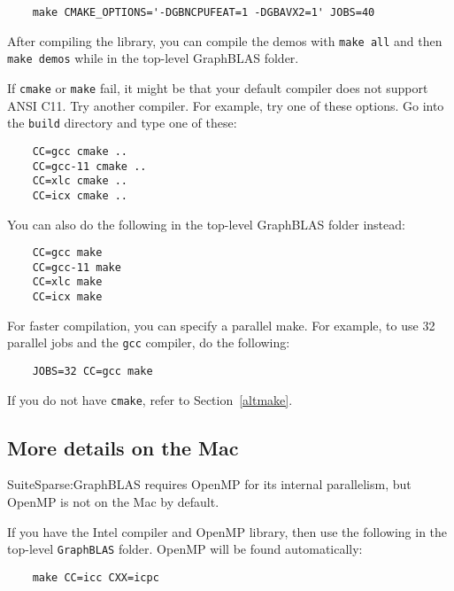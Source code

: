 \documentclass[12pt]{article}
\begin{document}
    {\small
    \begin{verbatim}
    make CMAKE_OPTIONS='-DGBNCPUFEAT=1 -DGBAVX2=1' JOBS=40 \end{verbatim} }

After compiling the library, you can compile the demos with
\verb'make all' and then \verb'make demos' while in the top-level
GraphBLAS folder.

If \verb'cmake' or \verb'make' fail, it might be that your default compiler
does not support ANSI C11.  Try another compiler.  For example, try one of
these options.  Go into the \verb'build' directory and type one of these:

    {\small
    \begin{verbatim}
    CC=gcc cmake ..
    CC=gcc-11 cmake ..
    CC=xlc cmake ..
    CC=icx cmake ..  \end{verbatim} }

You can also do the following in the top-level GraphBLAS folder instead:

    {\small
    \begin{verbatim}
    CC=gcc make
    CC=gcc-11 make
    CC=xlc make
    CC=icx make \end{verbatim} }

For faster compilation, you can specify a parallel make.  For example,
to use 32 parallel jobs and the \verb'gcc' compiler, do the following:

    {\small
    \begin{verbatim}
    JOBS=32 CC=gcc make \end{verbatim} }

If you do not have \verb'cmake', refer to Section~\ref{altmake}.

\subsection{More details on the Mac}

SuiteSparse:GraphBLAS requires OpenMP for its internal parallelism, but
OpenMP is not on the Mac by default.

If you have the Intel compiler and OpenMP library, then use the following
in the top-level \verb'GraphBLAS' folder.  OpenMP will be found automatically:

    {\small
    \begin{verbatim}
    make CC=icc CXX=icpc \end{verbatim} }
\end{document}
